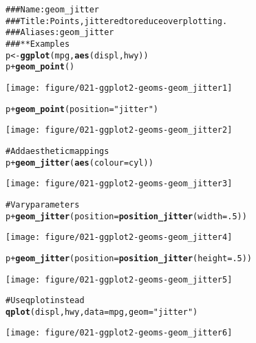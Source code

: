 \documentclass[a4paper,titlepage]{tufte-handout}\usepackage{graphicx, color}
\makeatletter
\def\maxwidth{ %
  \ifdim\Gin@nat@width>\linewidth
    \linewidth
  \else
    \Gin@nat@width
  \fi
}
\newcommand{\hlfunctioncall}[1]{\textcolor[rgb]{0.501960784313725,0,0.329411764705882}{\textbf{#1}}}%
\newcommand{\hlstring}[1]{\textcolor[rgb]{0.6,0.6,1}{#1}}%
\newcommand{\hlcomment}[1]{\textcolor[rgb]{0.180392156862745,0.6,0.341176470588235}{#1}}%
\newenvironment{kframe}{%
 \def\at@end@of@kframe{}%
 \ifinner\ifhmode%
  \def\at@end@of@kframe{\end{minipage}}%
  \begin{minipage}{\columnwidth}%
 \fi\fi%
 \def\FrameCommand##1{\hskip\@totalleftmargin \hskip-\fboxsep
 \colorbox{shadecolor}{##1}\hskip-\fboxsep
     \hskip-\linewidth \hskip-\@totalleftmargin \hskip\columnwidth}%
 \MakeFramed {\advance\hsize-\width
   \@totalleftmargin\z@ \linewidth\hsize
   \@setminipage}}%
 {\par\unskip\endMakeFramed%
 \at@end@of@kframe}
\newenvironment{knitrout}{}{} %
\makeatother
\begin{document}
\begin{knitrout}
\color{fgcolor}\begin{kframe}
\begin{alltt}
\hlcomment{### Name: geom_jitter}
\hlcomment{### Title: Points, jittered to reduce overplotting.}
\hlcomment{### Aliases: geom_jitter}
\hlcomment{### ** Examples}
p <- \hlfunctioncall{ggplot}(mpg, \hlfunctioncall{aes}(displ, hwy))
p + \hlfunctioncall{geom_point}()
\end{alltt}
\end{kframe}\texttt{[image: figure/021-ggplot2-geoms-geom\_jitter1]} \begin{kframe}\begin{alltt}
p + \hlfunctioncall{geom_point}(position = \hlstring{"jitter"})
\end{alltt}
\end{kframe}\texttt{[image: figure/021-ggplot2-geoms-geom\_jitter2]} \begin{kframe}\begin{alltt}
\hlcomment{# Add aesthetic mappings}
p + \hlfunctioncall{geom_jitter}(\hlfunctioncall{aes}(colour = cyl))
\end{alltt}
\end{kframe}\texttt{[image: figure/021-ggplot2-geoms-geom\_jitter3]} \begin{kframe}\begin{alltt}
\hlcomment{# Vary parameters}
p + \hlfunctioncall{geom_jitter}(position = \hlfunctioncall{position_jitter}(width = .5))
\end{alltt}
\end{kframe}\texttt{[image: figure/021-ggplot2-geoms-geom\_jitter4]} \begin{kframe}\begin{alltt}
p + \hlfunctioncall{geom_jitter}(position = \hlfunctioncall{position_jitter}(height = .5))
\end{alltt}
\end{kframe}\texttt{[image: figure/021-ggplot2-geoms-geom\_jitter5]} \begin{kframe}\begin{alltt}
\hlcomment{# Use qplot instead}
\hlfunctioncall{qplot}(displ, hwy, data = mpg, geom = \hlstring{"jitter"})
\end{alltt}
\end{kframe}\texttt{[image: figure/021-ggplot2-geoms-geom\_jitter6]} \begin{kframe}\begin{alltt}

\end{alltt}
\end{kframe}
\end{knitrout}
\end{document}
